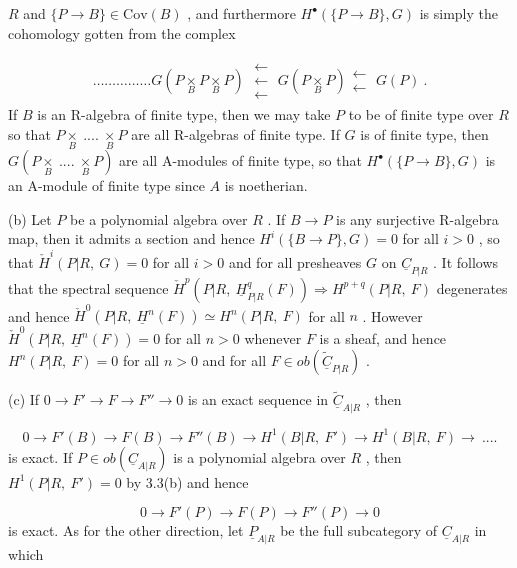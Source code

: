 $R$  and  $\{P \to B\} \in \mathrm{Cov}(B)$  , and furthermore  $H^{\bullet}(\{P \to B\},G)$  is simply the
cohomology gotten from the complex

\begin{multline*}
\dots\dots\dots\dots\dots G(P \underset{B}{\times} P \underset{B}{\times} P) \;\substack{\longleftarrow\\ \longleftarrow\\ \longleftarrow}\; G(P \underset{B}{\times} P) \substack{\longleftarrow\\ \longleftarrow}\; G(P) \ .
\end{multline*}
If  $B$  is an R-algebra of finite type, then we may take  $P$  to be of finite type over  $R$  so that  $P\underset{B}{\times}\ ....\ \underset{B}{\times}P$  are all R-algebras of finite type. If  $G$  is of finite type, then  $G(P\underset{B}{\times}\ ....\ \underset{B}{\times}P)$  are all A-modules of finite type, so that  $H^{\bullet}(\{P \to B\},G)$  is an A-module of finite type since  $A$  is noetherian.

(b)  Let  $P$  be a polynomial algebra over  $R$ . If  $B \to P$  is any surjective R-algebra map, then it admits a section and hence  $H^{i}(\{B \to P\},G) = 0$  for all  $i > 0$ , so that  $\check{H}^{i}(P|R,\ G) = 0$  for all  $i > 0$  and for all presheaves  $G$  on  $\underline{C}_{P|R}$ . It follows that the spectral sequence  $\check{H}^{p}(P|R,\ \underline{H}^{q}_{P|R}(F)) \Rightarrow H^{p+q}(P|R,\ F)$  degenerates and hence  $\check{H}^{0}(P|R,\ \underline{H}^{n}(F)) \simeq H^{n}(P|R,\ F)$  for all  $n$ . However  $\check{H}^{0}(P|R,\ \underline{H}^{n}(F)) = 0$  for all  $n > 0$  whenever  $F$  is a sheaf, and hence  $H^{n}(P|R,\ F) = 0$  for all  $n > 0$  and for all  $F \in ob(\widetilde{\underline{C}}_{P|R})$ .

(c)  If  $0 \to F' \to F \to F'' \to 0$  is an exact sequence in  $\widetilde{\underline{C}}_{A|R}$ , then

\begin{equation*}
0 \to F'(B) \to F(B) \to F''(B) \to H^{1}(B|R,\ F') \to H^{1}(B|R,\ F) \to \ ....
\end{equation*}
is exact. If  $P \in ob(\underline{C}_{A|R})$  is a polynomial algebra over  $R$ , then  $H^{1}(P|R,\ F') = 0$  by 3.3(b) and hence

\begin{equation*}
0 \to F'(P) \to F(P) \to F''(P) \to 0
\end{equation*}
is exact. As for the other direction, let  $\underline{P}_{A|R}$  be the full subcategory of  $\underline{C}_{A|R}$  in which

